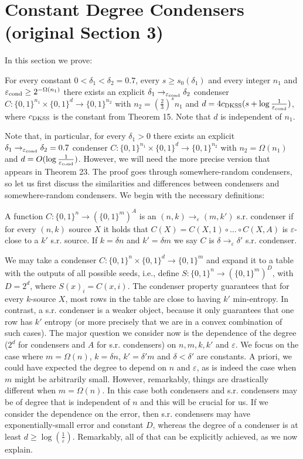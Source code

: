 \section*{Constant Degree Condensers (original Section 3)}
In this section we prove:
\begin{theorem}
For every constant $0<\delta_1<\delta_2=0.7$, every $s\ge s_0(\delta_1)$ and every integer $n_1$ and $\varepsilon_{\rm cond}\ge2^{-\Omega(n_1)}$ there exists an explicit $\delta_1\to_{\varepsilon_{\rm cond}}\delta_2$ condenser $C:\{0,1\}^{n_1}\times\{0,1\}^d\to\{0,1\}^{n_2}$ with $n_2=(\frac23)^sn_1$ and $d=4c_{\rm DKSS}(s+\log\frac1{\varepsilon_{\rm cond}})$, where $c_{\rm DKSS}$ is the constant from Theorem 15. Note that $d$ is independent of $n_1$.
\end{theorem}
Note that, in particular, for every $\delta_1>0$ there exists an explicit $\delta_1\to_{\varepsilon_{\rm cond}}\delta_2=0.7$ condenser $C:\{0,1\}^{n_1}\times\{0,1\}^d\to\{0,1\}^{n_2}$ with $n_2=\Omega(n_1)$ and $d=O(\log\frac1{\varepsilon_{\rm cond}})$. However, we will need the more precise version that appears in Theorem 23.
The proof goes through somewhere-random condensers, so let us first discuss the similarities and differences between condensers and somewhere-random condensers. We begin with the necessary definitions:
\begin{definition}[s.r. condenser]
A function $C:\{0,1\}^n\to(\{0,1\}^m)^A$ is an $(n,k)\to_\varepsilon(m,k')$ s.r. condenser if for every $(n,k)$ source $X$ it holds that $C(X)=C(X,1)\circ\ldots\circ C(X,A)$ is $\varepsilon$-close to a $k'$ s.r. source. If $k=\delta n$ and $k'=\delta m$ we say $C$ is $\delta\to_\varepsilon\delta'$ s.r. condenser.
\end{definition}
We may take a condenser $C:\{0,1\}^n\times\{0,1\}^d\to\{0,1\}^m$ and expand it to a table with the outputs of all possible seeds, i.e., define $S:\{0,1\}^n\to(\{0,1\}^m)^D$, with $D=2^d$, where $S(x)_i=C(x,i)$. The condenser property guarantees that for every $k$-source $X$, most rows in the table are close to having $k'$ min-entropy. In contrast, a s.r. condenser is a weaker object, because it only guarantees that one row has $k'$ entropy (or more precisely that we are in a convex combination of such cases).
The major question we consider now is the dependence of the degree ($2^d$ for condensers and $A$ for s.r. condensers) on $n,m,k,k'$ and $\varepsilon$. We focus on the case where $m=\Omega(n)$, $k=\delta n$, $k'=\delta'm$ and $\delta<\delta'$ are constants. A priori, we could have expected the degree to depend on $n$ and $\varepsilon$, as is indeed the case when $m$ might be arbitrarily small. However, remarkably, things are drastically different when $m=\Omega(n)$. In this case both condensers and s.r. condensers may be of degree that is independent of $n$ and this will be crucial for us. If we consider the dependence on the error, then s.r. condensers may have exponentially-small error and constant $D$, whereas the degree of a condenser is at least $d\ge\log(\frac1\varepsilon)$. Remarkably, all of that can be explicitly achieved, as we now explain.
